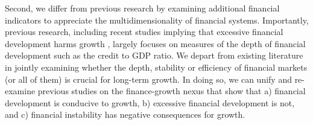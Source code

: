 \begin{refsection}
Second, we differ from previous research by examining additional financial indicators to appreciate the multidimensionality of financial systems. Importantly, previous research, including recent studies implying that excessive financial development harms growth \parencite{Arcandetal2012,CecchettiKharroubi2012,LawSingh2014}, largely focuses on measures of the depth of financial development such as the credit to GDP ratio. We depart from existing literature in jointly examining whether the depth, stability or efficiency of financial markets (or all of them) is crucial for long-term growth. In doing so, we can unify and re-examine previous studies on the finance-growth nexus that show that a) financial development is conducive to growth, b) excessive financial development is not, and c) financial instability has negative consequences for growth.


\end{refsection}
